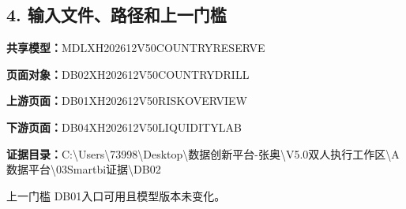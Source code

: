 \documentclass[UTF8,openany,zihao=-4]{ctexbook}
\renewcommand{\_}{\textunderscore\allowbreak}
\begin{document}
\subsection*{4. 输入文件、路径和上一门槛}
\noindent\textbf{共享模型：}{\promptlatin\promptcjk\small MDL\_\allowbreak{}XH202612\_\allowbreak{}V50\_\allowbreak{}COUNTRY\_\allowbreak{}RESERVE}\par
\noindent\textbf{页面对象：}{\promptlatin\promptcjk\small DB02\_\allowbreak{}XH202612\_\allowbreak{}V50\_\allowbreak{}COUNTRY\_\allowbreak{}DRILL}\par
\noindent\textbf{上游页面：}{\promptlatin\promptcjk\small DB01\_\allowbreak{}XH202612\_\allowbreak{}V50\_\allowbreak{}RISK\_\allowbreak{}OVERVIEW}\par
\noindent\textbf{下游页面：}{\promptlatin\promptcjk\small DB04\_\allowbreak{}XH202612\_\allowbreak{}V50\_\allowbreak{}LIQUIDITY\_\allowbreak{}LAB}\par
\noindent\textbf{证据目录：}{\promptlatin\promptcjk\small C:\textbackslash{}\allowbreak{}Users\textbackslash{}\allowbreak{}73998\textbackslash{}\allowbreak{}Desktop\textbackslash{}\allowbreak{}数据创新平台-\allowbreak{}张奥\textbackslash{}\allowbreak{}V5.0\_\allowbreak{}双人执行工作区\textbackslash{}\allowbreak{}A\_\allowbreak{}数据平台\textbackslash{}\allowbreak{}03\_\allowbreak{}Smartbi证据\textbackslash{}\allowbreak{}DB02}\par
\begin{gatebox}{上一门槛}
DB01入口可用且模型版本未变化。

\end{gatebox}
\end{document}
